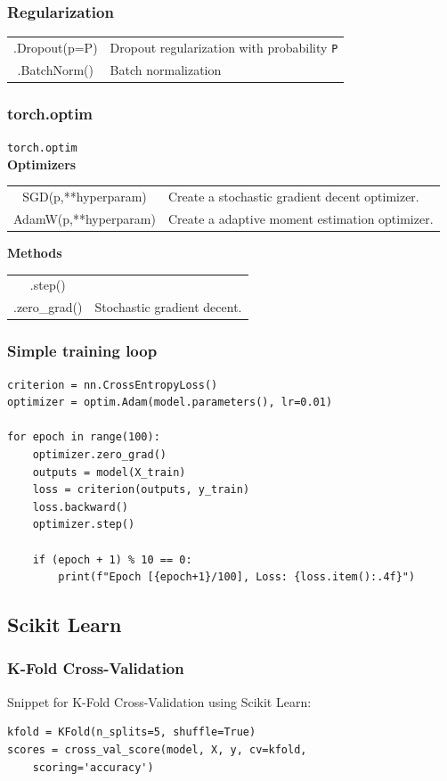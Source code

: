 \documentclass[5pt]{article}
\begin{document}
\begin{multicols}{2}
\subsubsection{Regularization}
\begin{tabular}{C L}
.Dropout(p=P)   & Dropout regularization with probability \texttt{P}\\
.BatchNorm()    & Batch normalization\\
\end{tabular}

\subsubsection{torch.optim}
\texttt{torch.optim}\\
\textbf{Optimizers}\\
\begin{tabular}{C L}
SGD(p,**hyperparam)    & Create a stochastic gradient decent optimizer.\\
AdamW(p,**hyperparam)  & Create a adaptive moment estimation optimizer.\\
\end{tabular}
\textbf{Methods}\\
\begin{tabular}{C L}
.step()         & \\
.zero\_grad()    & Stochastic gradient decent.\\
\end{tabular}

\subsubsection{Simple training loop}
\begin{verbatim}
criterion = nn.CrossEntropyLoss()
optimizer = optim.Adam(model.parameters(), lr=0.01)

for epoch in range(100):
    optimizer.zero_grad()          
    outputs = model(X_train)       
    loss = criterion(outputs, y_train)  
    loss.backward()               
    optimizer.step()   

    if (epoch + 1) % 10 == 0:
        print(f"Epoch [{epoch+1}/100], Loss: {loss.item():.4f}") 
\end{verbatim}

\subsection{Scikit Learn}
\subsubsection{K-Fold Cross-Validation}
Snippet for K-Fold Cross-Validation using Scikit Learn:
\begin{verbatim}
kfold = KFold(n_splits=5, shuffle=True)
scores = cross_val_score(model, X, y, cv=kfold, 
    scoring='accuracy')


\end{verbatim}
\end{multicols}
\end{document}

